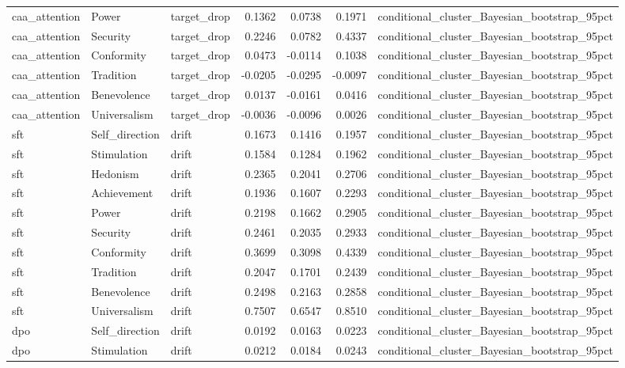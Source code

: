 \begin{tabular}{lllrrrl}
caa\_attention & Power & target\_drop & 0.1362 & 0.0738 & 0.1971 & conditional\_cluster\_Bayesian\_bootstrap\_95pct \\
caa\_attention & Security & target\_drop & 0.2246 & 0.0782 & 0.4337 & conditional\_cluster\_Bayesian\_bootstrap\_95pct \\
caa\_attention & Conformity & target\_drop & 0.0473 & -0.0114 & 0.1038 & conditional\_cluster\_Bayesian\_bootstrap\_95pct \\
caa\_attention & Tradition & target\_drop & -0.0205 & -0.0295 & -0.0097 & conditional\_cluster\_Bayesian\_bootstrap\_95pct \\
caa\_attention & Benevolence & target\_drop & 0.0137 & -0.0161 & 0.0416 & conditional\_cluster\_Bayesian\_bootstrap\_95pct \\
caa\_attention & Universalism & target\_drop & -0.0036 & -0.0096 & 0.0026 & conditional\_cluster\_Bayesian\_bootstrap\_95pct \\
sft & Self\_direction & drift & 0.1673 & 0.1416 & 0.1957 & conditional\_cluster\_Bayesian\_bootstrap\_95pct \\
sft & Stimulation & drift & 0.1584 & 0.1284 & 0.1962 & conditional\_cluster\_Bayesian\_bootstrap\_95pct \\
sft & Hedonism & drift & 0.2365 & 0.2041 & 0.2706 & conditional\_cluster\_Bayesian\_bootstrap\_95pct \\
sft & Achievement & drift & 0.1936 & 0.1607 & 0.2293 & conditional\_cluster\_Bayesian\_bootstrap\_95pct \\
sft & Power & drift & 0.2198 & 0.1662 & 0.2905 & conditional\_cluster\_Bayesian\_bootstrap\_95pct \\
sft & Security & drift & 0.2461 & 0.2035 & 0.2933 & conditional\_cluster\_Bayesian\_bootstrap\_95pct \\
sft & Conformity & drift & 0.3699 & 0.3098 & 0.4339 & conditional\_cluster\_Bayesian\_bootstrap\_95pct \\
sft & Tradition & drift & 0.2047 & 0.1701 & 0.2439 & conditional\_cluster\_Bayesian\_bootstrap\_95pct \\
sft & Benevolence & drift & 0.2498 & 0.2163 & 0.2858 & conditional\_cluster\_Bayesian\_bootstrap\_95pct \\
sft & Universalism & drift & 0.7507 & 0.6547 & 0.8510 & conditional\_cluster\_Bayesian\_bootstrap\_95pct \\
dpo & Self\_direction & drift & 0.0192 & 0.0163 & 0.0223 & conditional\_cluster\_Bayesian\_bootstrap\_95pct \\
dpo & Stimulation & drift & 0.0212 & 0.0184 & 0.0243 & conditional\_cluster\_Bayesian\_bootstrap\_95pct \\

\end{tabular}
